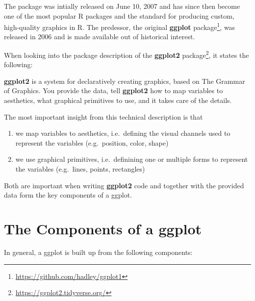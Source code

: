 \documentclass[
]{krantz}
\providecommand{\tightlist}{%
  \setlength{\itemsep}{0pt}\setlength{\parskip}{0pt}}
\renewenvironment{quote}{\begin{VF}}{\end{VF}}
\renewcommand{\href}[2]{#2\footnote{\url{#1}}}
\begin{document}
The package was intially released on June 10, 2007 and has since then become one of the most popular R packages and the standard for producing custom, high-quality graphics in R. The predessor, the original \href{https://github.com/hadley/ggplot1}{\textbf{ggplot} package}, was released in 2006 and is made available out of historical interest.

When looking into the package description of the \href{https://ggplot2.tidyverse.org/}{\textbf{ggplot2} package}, it states the following:

\begin{quote}
\textbf{ggplot2} is a system for declaratively creating graphics, based on The Grammar of Graphics. You provide the data, tell \textbf{ggplot2} how to map variables to aesthetics, what graphical primitives to use, and it takes care of the details.
\end{quote}

The most important insight from this technical description is that

\begin{enumerate}
\def\labelenumi{\arabic{enumi}.}
\tightlist
\item
  we map variables to aesthetics, i.e.~defining the visual channels used to represent the variables (e.g.~position, color, shape)
\item
  we use graphical primitives, i.e.~definining one or multiple forms to represent the variables (e.g.~lines, points, rectangles)
\end{enumerate}

Both are important when writing \textbf{ggplot2} code and together with the provided data form the key components of a ggplot.

\hypertarget{components}{%
\section{The Components of a ggplot}\label{components}}

In general, a ggplot is built up from the following components:
\end{document}
